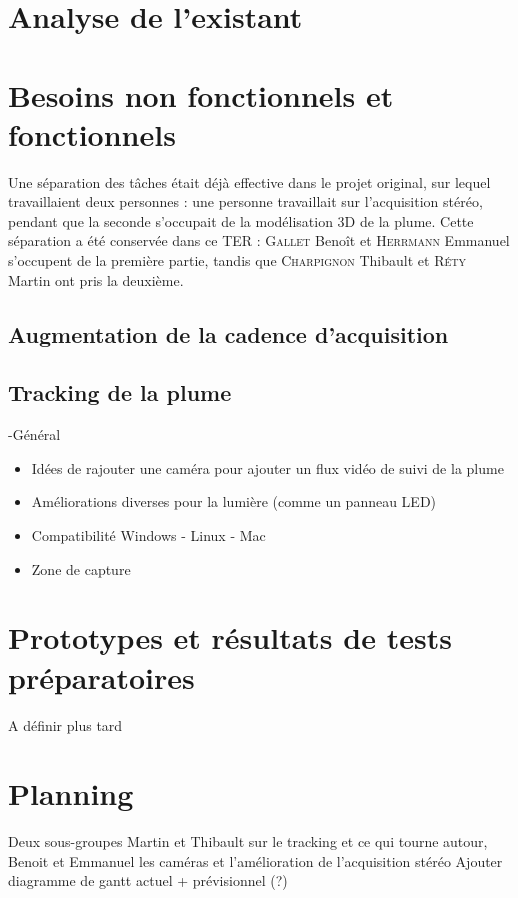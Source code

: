 \documentclass{article}
\begin{document}
\section{Analyse de l'existant}



\section{Besoins non fonctionnels et fonctionnels}

	Une séparation des tâches était déjà effective dans le projet original, sur lequel travaillaient deux personnes : une personne travaillait sur l'acquisition stéréo, pendant que la seconde s'occupait de la modélisation 3D de la plume. Cette séparation a été conservée dans ce TER : \textsc{Gallet} Benoît et \textsc{Herrmann} Emmanuel s'occupent de la première partie, tandis que \textsc{Charpignon} Thibault et \textsc{Réty} Martin ont pris la deuxième.

\subsection{Augmentation de la cadence d'acquisition}



\subsection{Tracking de la plume}



-Général
\begin{itemize}
\item Idées de rajouter une caméra pour ajouter un flux vidéo de suivi de la plume
\item Améliorations diverses pour la lumière (comme un panneau LED)
\item Compatibilité Windows - Linux - Mac
\item Zone de capture
\end{itemize}

\section{Prototypes et résultats de tests préparatoires}
A définir plus tard

\section{Planning}
Deux sous-groupes
Martin et Thibault sur le tracking et ce qui tourne autour, Benoit et Emmanuel les caméras et l'amélioration de l'acquisition stéréo
Ajouter diagramme de gantt actuel + prévisionnel (?)


\nocite{*}

 
 
\end{document}
